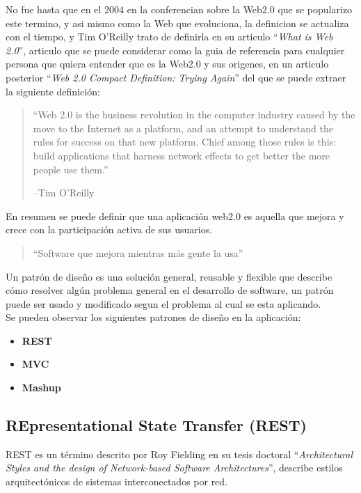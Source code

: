     No fue hasta que en  el 2004 en la conferencian sobre la Web2.0 que se popularizo este termino, 
    y asi mismo como la Web que evoluciona, la definicion se actualiza con el tiempo, 
    y Tim O’Reilly trato de definirla en su articulo ``\emph{What is Web 2.0}''\cite{web5},
    articulo que se puede considerar como la guia de referencia para cualquier persona que quiera
    entender que es la Web2.0 y sus origenes,
    en un articulo posterior ``\emph{Web 2.0 Compact Definition: Trying Again}''\cite{web9}
    del que se puede extraer la siguiente definici\'on:
    \begin{quote}
      “Web 2.0 is the business revolution in the computer industry caused by the move to the
       Internet as a platform, and an attempt to understand the rules for success on that new
       platform. Chief among those rules is this: build applications that harness network
       effects to get better the more people use them.”
       \begin{flushright}
       --Tim O’Reilly
       \end{flushright}
    \end{quote}
    En resumen se puede definir que una aplicación web2.0 es aquella que mejora y crece con la 
    participación activa de sus usuarios.

    \begin{quote}
      “Software que mejora mientras más gente la usa” \cite{web5}
    \end{quote}

    Un patrón de diseño es una solución general, reusable  y flexible 
    que describe cómo resolver algún problema general en el desarrollo 
    de software, un patrón puede ser usado y modificado segun el problema 
    al cual se esta aplicando.\\
    Se pueden observar los siguientes patrones de dise\~no en la aplicación:
    \begin{itemize}
      \item \textbf{REST}
      \item \textbf{MVC}
      \item \textbf{Mashup}
    \end{itemize}

    \subsection{REpresentational State Transfer (REST)} %
    \label{sub:rest}
      REST es un término descrito por Roy Fielding en su tesis doctoral ``\emph{Architectural Styles and the design of Network-based Software Architectures}''\cite{web6}, describe estilos arquitectónicos de sistemas interconectados por red.

